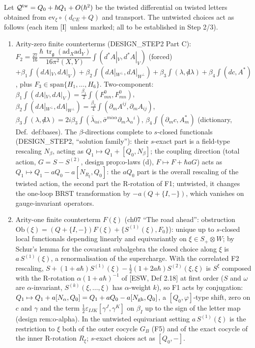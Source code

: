 \documentclass[11pt]{article}
\theoremstyle{definition}
\newcommand{\tr}{\operatorname{tr}}
\newcommand{\Il}{\textup{[I]}}
\newcommand{\unit}{\dfrac{\hbar\,\tr_{\mathfrak g}(\mathrm{ad}_X\mathrm{ad}_Y)}{16\pi^2(X,Y)}}
\begin{document}
Let $\mathcal Q^{\rm tw}=Q_0+\hbar Q_1+O(\hbar^2)$ be the twisted differential on twisted letters obtained from $\mathrm{ev}_\xi\circ(d_{CE}+Q)$ and transport. The untwisted choices act as follows (each item \Il\ unless marked; all to be established in Step 2/3).
\begin{enumerate}
\item[F0.] Arity-zero finite counterterms (DESIGN\_STEP2 Part C): $F_2=\frac{27}{16}\,\unit\int(d^*A|_V,d^*A|_V)$ (forced) $+\beta_1\int(dA|_V,dA|_V)+\beta_2\int(dA|_{W^\perp},dA|_{W^\perp})+\beta_3\int(\lambda,{\not d}\lambda)+\beta_4\int(dc,A^*)$, plus $F_3\in\mathrm{span}\{H_1,\dots,H_6\}$. Two-component: $\beta_1\int(dA|_V,dA|_V)=\frac{\beta_1}2\int(F^0_{mn},F^0_{mn})$, $\beta_2\int(dA|_{W^\perp},dA|_{W^\perp})=\frac{\beta_2}4\int(\partial_mA^{ij},\partial_mA_{ij})$, $\beta_3\int(\lambda,{\not d}\lambda)=2i\beta_3\int(\bar\lambda_{\dot\alpha i},\bar\sigma^{m\dot\alpha\alpha}\partial_m\lambda_\alpha{}^i)$, $\beta_4\int(\partial_mc,A^*_m)$ (dictionary, Def.~def:bases). The $\beta$-directions complete to $s$-closed functionals (DESIGN\_STEP2, ``solution family''): their $s$-exact part is a field-type rescaling $N_\beta$, acting as $Q_1\mapsto Q_1+[Q_0,N_\beta]$; the coupling direction (total action, $G=S-S^{(2)}$, design prop:o-laws (d), $F\mapsto F+\hbar aG$) acts as $Q_1\mapsto Q_1-aQ_0-a[N_{R_\xi},Q_0]$: the $aQ_0$ part is the overall rescaling of the twisted action, the second part the R-rotation of F1; untwisted, it changes the one-loop BRST transformation by $-a(Q+\{I,-\})$, which vanishes on gauge-invariant operators.
\item[F1.] Arity-one finite counterterm $F(\xi)$ (ch07 ``The road ahead'': obstruction $\mathrm{Ob}(\xi)=(Q+\{I,-\})F(\xi)+\{S^{(1)}(\xi),F_0\}$): unique up to $s$-closed local functionals depending linearly and equivariantly on $\xi\in S_+\otimes W$; by Schur's lemma for the covariant subalgebra the closed choice along $\xi$ is $a\,S^{(1)}(\xi)$, a renormalisation of the supercharge. With the correlated F2 rescaling, $S+(1+a\hbar)S^{(1)}(\xi)-\frac12(1+2a\hbar)S^{(2)}(\xi,\xi)$ is $S^\xi$ composed with the R-rotation $\alpha(1+a\hbar)^{-1}$ of [ESW, Def 2.18] at first order ($S$ and $\omega$ are $\alpha$-invariant, $S^{(k)}(\xi,\dots,\xi)$ has $\alpha$-weight $k$), so F1 acts by conjugation: $Q_1\mapsto Q_1+a[N_\alpha,Q_0]=Q_1+aQ_0-a[N_{\rm gh},Q_0]$, a $[Q_0,\varphi]$-type shift, zero on $c$ and $\gamma$ and the term $\frac12\varepsilon_{IJK}[\gamma^J,\gamma^K]$ on $\beta_I$ up to the sign of the letter map (design rem:o-alpha). In the untwisted equivariant setting $a\,S^{(1)}(\xi)$ is the restriction to $\xi$ both of the outer cocycle $G_B$ (F5) and of the exact cocycle of the inner R-rotation $R_\xi$; $s$-exact choices act as $[Q_0,-]$.

\end{enumerate}
\end{document}
